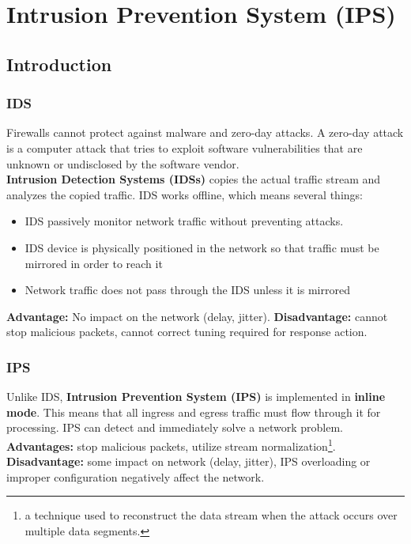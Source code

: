 \chapter{Intrusion Prevention System (IPS)}

\section{Introduction}

\subsection{IDS}

Firewalls cannot protect against malware and zero-day attacks. A zero-day attack is a computer attack that tries to exploit software vulnerabilities that are unknown or undisclosed by the software vendor. \\

\textbf{Intrusion Detection Systems (IDSs)} copies the actual traffic stream and analyzes the copied traffic. IDS works offline, which means several things:

\begin{itemize}
\item IDS passively monitor network traffic without preventing attacks.
\item IDS device is physically positioned in the network so that traffic must be mirrored in order to reach it
\item Network traffic does not pass through the IDS unless it is mirrored
\end{itemize}

\textbf{Advantage:} No impact on the network (delay, jitter). \textbf{Disadvantage:} cannot stop malicious packets, cannot correct tuning required for response action.

\subsection{IPS}

Unlike IDS, \textbf{Intrusion Prevention System (IPS)} is implemented in \textbf{inline mode}. This means that all ingress and egress traffic must flow through it for processing. IPS can detect and immediately solve a network problem. \\

\textbf{Advantages:} stop malicious packets, utilize stream normalization\footnote{a technique used to reconstruct the data stream when the attack occurs over multiple data segments.}. \textbf{Disadvantage:} some impact on network (delay, jitter), IPS overloading or improper configuration negatively affect the network.\\

